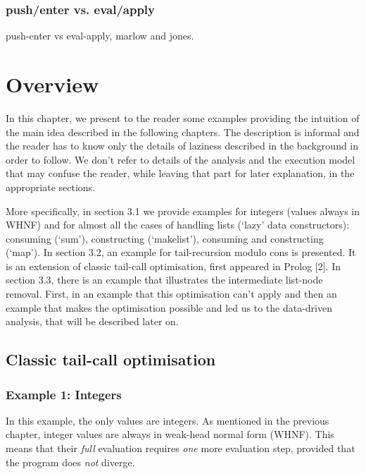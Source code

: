 \documentclass[diploma]{softlab-thesis}
\begin{document}
\subsection{push/enter vs. eval/apply}
push-enter vs eval-apply, marlow and jones.







\chapter {Overview}

In this chapter, we present to the reader some examples providing the intuition of the main idea described 
in the following chapters. The description is informal and the reader has to know only the details of laziness 
described in the background in order to follow. We don't refer to details of the analysis and the execution model 
that may confuse the reader, while leaving that part for later explanation, in the appropriate sections.

More specifically, in section 3.1 we provide examples for integers (values always in WHNF) and 
for almost all the cases of handling lists (`lazy' data constructors): 
consuming (`sum'), constructing (`makelist'), consuming and constructing (`map'). 
In section 3.2, an example for tail-recursion modulo cons is presented. It is an extension of classic 
tail-call optimisation, first appeared in Prolog [2].
In section 3.3, there is an example that illustrates the intermediate list-node removal. First, in an example 
that this optimisation can't apply and then an example that makes the optimisation possible and led us to 
the data-driven analysis, that will be described later on.

\section {Classic tail-call optimisation}

\subsection {Example 1: Integers}
In this example, the only values are integers. As mentioned 
in the previous chapter, integer values are always in weak-head normal 
form (WHNF). This means that their \textit{full} evaluation requires \textit{one} more evaluation
step, provided that the program does \textit{not} diverge. 
\end{document}
